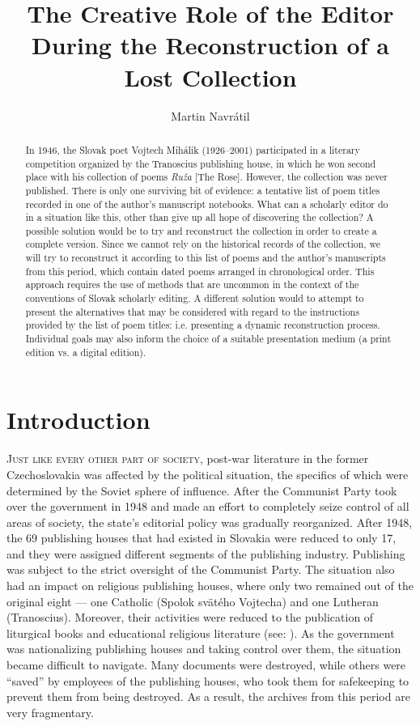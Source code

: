 \documentclass{article}
\author{Martin Navrátil}
\title{The Creative Role of the Editor During the Reconstruction of a Lost Collection}
\begin{document}
\maketitle

\begin{abstract}
In 1946, the Slovak poet Vojtech Mihálik (1926--2001) participated in
a literary competition organized by the Tranoscius publishing house, in
which he won second place with his collection of poems \emph{Ruža} [The Rose]. However, the collection was never published. There is only one
surviving bit of evidence: a tentative list of poem titles recorded in one of the author's manuscript notebooks. What can a scholarly
editor do in a situation like this, other than give up all hope of
discovering the collection? A possible solution would be to try and reconstruct
the collection in order to create a complete version. Since we cannot
rely on the historical records of the collection, we will try to
reconstruct it according to this list of poems and the author's
manuscripts from this period, which contain dated poems arranged in
chronological order. This approach requires the use of methods that are
uncommon in the context of the conventions of Slovak scholarly editing.
A different solution would to attempt to present the alternatives
that may be considered with regard to the instructions provided by the
list of poem titles: i.e. presenting a dynamic reconstruction process.
Individual goals may also inform the choice of a suitable presentation
medium (a print edition vs. a digital edition).
\end{abstract}


\section*{Introduction}
\textsc{Just like every other part of society,} post-war literature in the former
Czechoslovakia was affected by the political situation, the specifics of
which were determined by the Soviet sphere of influence. After the
Communist Party took over the government in 1948 and made an effort to
completely seize control of all areas of society, the state's editorial
policy was gradually reorganized. After 1948, the 69 publishing houses
that had existed in Slovakia were reduced to only 17, and they were
assigned different segments of the publishing industry. Publishing was
subject to the strict oversight of the Communist Party. The situation
also had an impact on religious publishing houses, where only two
remained out of the original eight –– one Catholic (Spolok svätého
Vojtecha) and one Lutheran (Tranoscius). Moreover, their activities were
reduced to the publication of liturgical books and educational religious
literature (see: \cite{sutovec_k_2011}). As the government was nationalizing
publishing houses and taking control over them, the situation became
difficult to navigate. Many documents were destroyed, while others were
``saved'' by employees of the publishing houses, who took them for
safekeeping to prevent them from being destroyed. As a result, the
archives from this period are very fragmentary.
\end{document}
